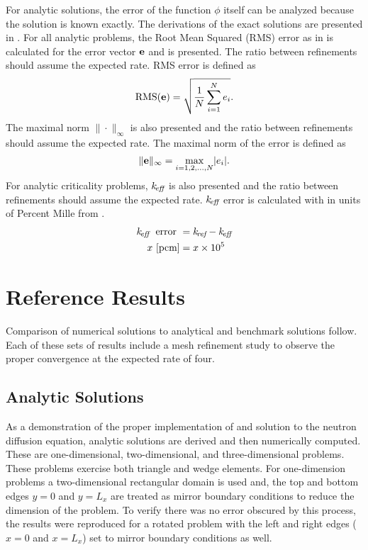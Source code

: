   For analytic solutions, the error of the function $\phi$ itself can be 
  analyzed because the solution is known exactly. The derivations of the exact 
  solutions are presented in . For all analytic 
  problems, the Root Mean Squared (RMS) error as in  is calculated
  for the error vector $\mathbf{e}$ and is presented. The ratio between refinements 
  should assume the expected rate. RMS error is defined as
  \begin{equation} \label{eq:rms}
    \text{RMS}(\mathbf{e}) = \sqrt{\frac{1}{N} \sum_{i=1}^{N} e_i}.
  \end{equation}
  The maximal norm $\| \cdot \|_{\infty}$ is also presented and the ratio 
  between refinements should assume the expected rate. The maximal norm of the
  error is defined as
  \begin{equation} \label{eq:infnorm}
    \|\mathbf{e}\|_{\infty} = \max_{i=1,2,\ldots,N} \lvert e_i \rvert.
  \end{equation}
  For analytic criticality  problems, $k_{\!\mbox{\scriptsize \em eff}}$ is also presented and the ratio 
  between refinements should assume the expected rate. $k_{\!\mbox{\scriptsize \em eff}}$ error is 
  calculated with  in units of Percent Mille  from 
  .
  \begin{align}
    \label{eq:keff_err}
    k_{\!\mbox{\scriptsize \em eff}} \; \text{ error } &= k_{\!\mbox{\scriptsize \em ref}} - k_{\!\mbox{\scriptsize \em eff}} \\
    \label{eq:pcm}
    x \,\left[\text{{pcm}}\right] &= x \times 10^5
  \end{align}

\section{Reference Results}
  Comparison of numerical solutions to analytical and benchmark solutions
  follow. Each of these sets of results include a mesh refinement study to
  observe the proper convergence at the expected rate of four.

  \subsection{Analytic Solutions}
    As a demonstration of the proper implementation of and solution to the 
    neutron diffusion equation, analytic solutions are derived and then 
    numerically computed. These are one-dimensional, two-dimensional, and 
    three-dimensional problems. These problems exercise both triangle and wedge 
    elements. For one-dimension problems a two-dimensional rectangular domain is
    used and, the top and bottom edges $y=0$ and $y=L_x$ are treated as mirror 
    boundary conditions to reduce the dimension of the problem. To verify there
    was no error obscured by this process, the results were reproduced for a 
    rotated problem with the left and right edges ($x=0$ and $x=L_x$) set to
    mirror boundary conditions as well.

